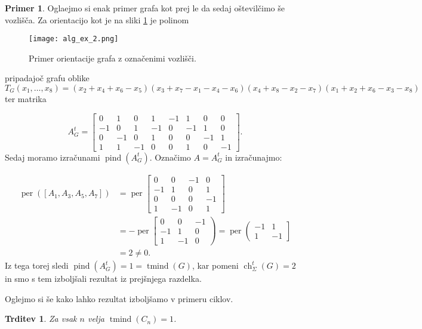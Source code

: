 \documentclass[12pt,a4paper,twoside]{article}
\theoremstyle{definition} %
\newtheorem{primer}[definicija]{Primer}
\theoremstyle{plain} %
\newtheorem{trditev}[definicija]{Trditev}
\newcommand{\eclt}{\ch_{\Sigma}^t}
\numberwithin{equation}{section}  %
\DeclareMathOperator{\per}{per}
\DeclareMathOperator{\tmind}{tmind}
\DeclareMathOperator{\pind}{pind}
\DeclareMathOperator{\ch}{ch}
\begin{document}
\begin{primer}
Oglaejmo si enak primer grafa kot prej le da sedaj oštevilčimo še vozlišča. Za orientacijo kot je na sliki \ref{ex_2} je polinom
 \begin{figure}[h!]
\caption{Primer orientacije grafa z označenimi vozlišči.}
\label{ex_2}
\centering
    \texttt{[image: alg\_ex\_2.png]}
    \end{figure}
pripadajoč grafu oblike $T_G(x_1, \ldots, x_8) = (x_2 + x_4 + x_6 - x_5)(x_3 + x_7 - x_1 - x_4 - x_6)(x_4 + x_8 - x_2 - x_7)(x_1 + x_2 + x_6 - x_3 - x_8)$ ter matrika 

$$A_G^t = \left[ \begin{matrix} 0 & 1 & 0 & 1 & -1 & 1 & 0 & 0 \\ -1 & 0 & 1 & -1 & 0 & -1 & 1 & 0 \\ 0 & -1 & 0 & 1 & 0 & 0 & -1 & 1 \\ 1 & 1 & -1 & 0 & 0 & 1 & 0 & -1 \end{matrix} \right].$$
Sedaj moramo izračunami $\pind(A_G^t)$. Označimo $A =A_G^t$ in izračunajmo:

\begin{equation*}
\begin{split}
 \per([A_1, A_3, A_5, A_7]) &= \per\left[ \begin{matrix} 0 & 0 & -1 & 0 \\ -1 & 1 & 0 & 1 \\ 0 & 0 & 0 & -1 \\ 1 & -1 & 0 & 1 \end{matrix} \right] \\
&= -\per\left[ \begin{matrix} 0 & 0 & -1 \\ -1 & 1 & 0 \\ 1 & -1 & 0 \end{matrix} \right) =\per\left( \begin{matrix} -1 & 1 \\ 1 & -1 \end{matrix} \right] \\
&=2 \neq 0.
\end{split}
\end{equation*}
Iz tega torej sledi $\pind(A_G^t) = 1 =\tmind(G)$, kar pomeni $\eclt(G) = 2$ in smo s tem izboljšali rezultat iz prejšnjega razdelka.
\end{primer}

Oglejmo si še kako lahko rezultat izboljšamo v primeru ciklov.
\begin{trditev}
Za vsak $n$ velja $\tmind(C_n) = 1$.
\end{trditev}
\end{document}
